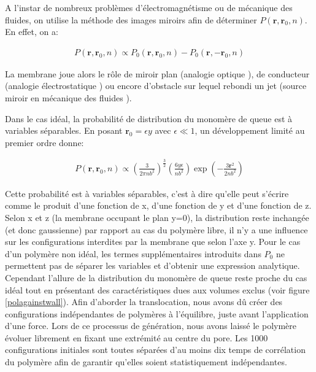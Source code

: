 A l'instar de nombreux problèmes d'électromagnétisme ou de mécanique des fluides, on utilise la méthode des images miroirs afin de déterminer $P(\textbf{r},\textbf{r}_0,n)$. En effet, on a:

\begin{eqnarray}
P(\textbf{r},\textbf{r}_0,n) \propto P_0(\textbf{r},\textbf{r}_0,n)-P_0(\textbf{r},-\textbf{r}_0,n)
\end{eqnarray}

La membrane joue alors le rôle de miroir plan (analogie optique \cite{lipson2011optical}), de conducteur (analogie électrostatique \cite{jackson1999classical}) ou encore d'obstacle sur lequel rebondi un jet (source miroir en mécanique des fluides \cite{kundu2008fluid}).

Dans le cas idéal, la probabilité de distribution du monomère de queue est à variables séparables. En posant $\textbf{r}_0= \epsilon y$ avec $\epsilon \ll 1$, un développement limité au premier ordre donne:

\begin{eqnarray}
P(\textbf{r},\textbf{r}_0,n) \propto \left(\frac{3}{2\pi n b^2}\right)^\frac{3}{2} \left(\frac{6 y \epsilon}{n b^2}\right)\exp\left(-\frac{3\textbf{r}^2}{2 n b^2}\right)
\end{eqnarray}

Cette probabilité est à variables séparables, c'est à dire qu'elle peut s'écrire comme le produit d'une fonction de x, d'une fonction de y  et d'une fonction de z. Selon x et z (la membrane occupant le plan y=0), la distribution reste inchangée (et donc gaussienne) par rapport au cas du polymère libre, il n'y a une influence sur les configurations interdites par la membrane que selon l'axe y. Pour le cas d'un polymère non idéal, les termes supplémentaires introduits dans $P_0$ ne permettent pas de séparer les variables et d'obtenir une expression analytique. Cependant l'allure de la distribution du monomère de queue reste proche du cas idéal tout en présentant des caractéristiques dues aux volumes exclus (voir figure \ref{polagainstwall}). Afin d'aborder la translocation, nous avons dû créer des configurations indépendantes de polymères à l'équilibre, juste avant l'application d'une force. Lors de ce processus de génération, nous avons laissé le polymère évoluer librement en fixant une extrémité au centre du pore. Les 1000 configurations initiales sont toutes séparées d'au moins dix temps de corrélation du polymère afin de garantir qu'elles soient statistiquement indépendantes.


